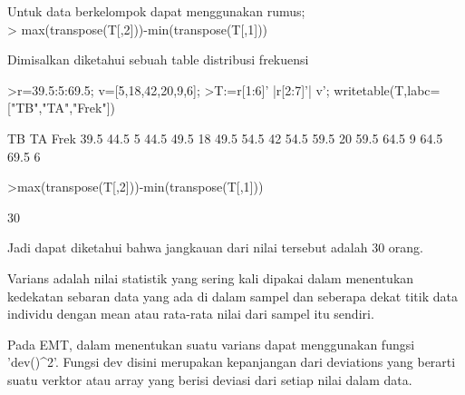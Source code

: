 \documentclass[a4paper,10pt]{article}
\begin{document}
\begin{eulernotebook}
\begin{eulercomment}
\begin{eulercomment}
\begin{eulercomment}
Untuk data berkelompok dapat menggunakan rumus;\\
\textgreater{} max(transpose(T[,2]))-min(transpose(T[,1]))

Dimisalkan diketahui sebuah table distribusi frekuensi
\end{eulercomment}
\begin{eulerprompt}
>r=39.5:5:69.5; v=[5,18,42,20,9,6];
>T:=r[1:6]' |r[2:7]'| v'; writetable(T,labc=["TB","TA","Frek"])
\end{eulerprompt}
\begin{euleroutput}
          TB        TA      Frek
        39.5      44.5         5
        44.5      49.5        18
        49.5      54.5        42
        54.5      59.5        20
        59.5      64.5         9
        64.5      69.5         6
\end{euleroutput}
\begin{eulerprompt}
>max(transpose(T[,2]))-min(transpose(T[,1]))
\end{eulerprompt}
\begin{euleroutput}
  30
\end{euleroutput}
\begin{eulercomment}
Jadi dapat diketahui bahwa jangkauan dari nilai tersebut adalah 30
orang. 
\end{eulercomment}
\begin{eulercomment}
Varians adalah nilai statistik yang sering kali dipakai dalam
menentukan kedekatan sebaran data yang ada di dalam sampel dan
seberapa dekat titik data individu dengan mean atau rata-rata nilai
dari sampel itu sendiri.

Pada EMT, dalam menentukan suatu varians dapat menggunakan fungsi
'dev()\textasciicircum{}2'. Fungsi dev disini merupakan kepanjangan dari deviations
yang berarti suatu verktor atau array yang berisi deviasi dari setiap
nilai dalam data. 


\end{eulercomment}
\end{eulercomment}
\end{eulercomment}
\end{eulernotebook}
\end{document}
